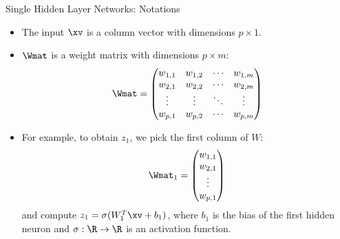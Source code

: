 \begin{vbframe}{Single Hidden Layer Networks: Notations}

\begin{itemize}
\item The input $\xv$ is a column vector with dimensions $p \times 1$. 
\item $\Wmat$ is a weight matrix with dimensions $p \times m$:
$$\Wmat =
     \begin{pmatrix}
      w_{1,1} & w_{1,2} & \cdots & w_{1,m} \\
      w_{2,1} & w_{2,2} & \cdots & w_{2,m} \\
      \vdots  & \vdots  & \ddots & \vdots  \\
      w_{p,1} & w_{p,2} & \cdots & w_{p,m}
     \end{pmatrix}$$
\item For example, to obtain $z_1$, we pick the first column of $W$:
    $$\Wmat_1 =
     \begin{pmatrix}
      w_{1,1} \\
      w_{2,1} \\
      \vdots  \\
      w_{p,1}
     \end{pmatrix}$$
and compute $z_1 = \sigma(W_1^T \xv + b_1)$, where $b_1$ is the bias of the first hidden neuron and $\sigma: \R \to \R$ is an activation function. 
\end{itemize}
\end{vbframe}

